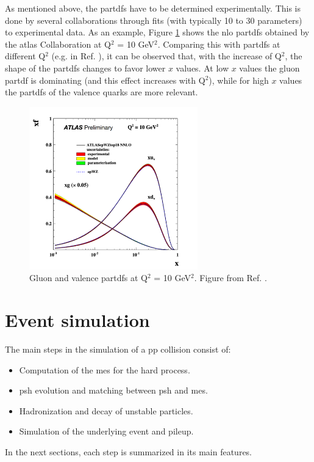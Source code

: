 As mentioned above, the \glspl{partdf} have to be determined experimentally. This is done by several collaborations through fits (with typically 10 to 30 parameters) to experimental data. 
As an example, Figure \ref{fig:sim:pp} shows the \gls{nlo} \glspl{partdf} obtained by the \gls{atlas} Collaboration at Q$^2$ = 10 GeV$^2$. 
Comparing this with \glspl{partdf} at different Q$^2$ (e.g. in Ref. \cite{Martin:2009iq}), it can be observed that, with the increase of Q$^2$, the shape of the \glspl{partdf} changes to favor lower $x$ values. At low $x$ values the gluon \gls{partdf} is dominating (and this effect increases with Q$^2$), while for high $x$ values the \glspl{partdf} of the valence quarks are more relevant.

\begin{figure}[h]
\begin{center}
    \includegraphics[width=0.65\textwidth]{figures/Chap4/Rizzi-Fig4-3.pdf}
\end{center}
\caption{Gluon and valence \glspl{partdf} at Q$^2$ = 10 GeV$^2$. 
Figure from Ref. \cite{ATL-PHYS-PUB-2018-017}.
}
 \label{fig:sim:pp}
\end{figure}


\section{Event simulation}
\label{sec:eventsimul}

The main steps in the simulation of a \gls{pp} collision consist of:
\begin{itemize}
\item Computation of the \glspl{me} for the hard process.
\item \Gls{psh} evolution and matching between \gls{psh} and \glspl{me}.
\item Hadronization and decay of unstable particles.
\item Simulation of the underlying event and pileup.
\end{itemize}
In the next sections, each step is summarized in its main features.


